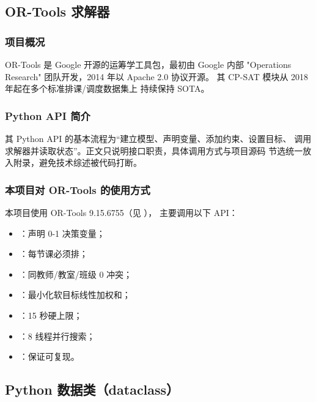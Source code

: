 \subsection{OR-Tools 求解器}

\subsubsection{项目概况}

OR-Tools 是 Google 开源的运筹学工具包，最初由 Google 内部
"Operations Research" 团队开发，2014 年以 Apache 2.0 协议开源。
其 CP-SAT 模块从 2018 年起在多个标准排课/调度数据集上
持续保持 SOTA。

\subsubsection{Python API 简介}

其 Python API 的基本流程为“建立模型、声明变量、添加约束、设置目标、
调用求解器并读取状态”。正文只说明接口职责，具体调用方式与项目源码
节选统一放入附录，避免技术综述被代码打断。

\subsubsection{本项目对 OR-Tools 的使用方式}

本项目使用 OR-Tools 9.15.6755（见 ），
主要调用以下 API：
\begin{itemize}[leftmargin=2em,itemsep=0.1em]
\item {}：声明 0-1 决策变量；
\item {}：每节课必须排；
\item {}：同教师/教室/班级 0 冲突；
\item {}：最小化软目标线性加权和；
\item {}：15 秒硬上限；
\item {}：8 线程并行搜索；
\item {}：保证可复现。
\end{itemize}

\subsection{Python 数据类（dataclass）}

